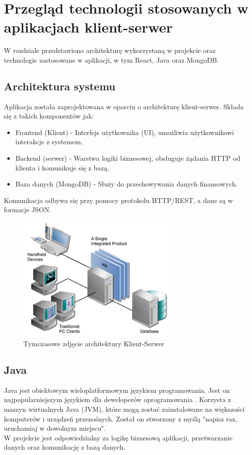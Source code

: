 \chapter{Przegląd technologii stosowanych w aplikacjach klient-serwer}
W rozdziale przedstawiono architekturę wykorzystaną w projekcie oraz technologie zastosowane w aplikacji, w tym React, Java oraz MongoDB.
\section{Architektura systemu}
Aplikacja została zaprojektowana w oparciu o architekturę klient-serwer. Składa się z takich komponentów jak:
\begin{itemize}
	\item Frontend (Klient) - Interfejs użytkownika (UI), umożliwia użytkownikowi interakcje z systemem.
	\item Backend (serwer) - Warstwa logiki biznesowej, obsługuje żądania HTTP od klienta i komunikuje się z bazą.
	\item Baza danych (MongoDB) - Służy do przechowywania danych finansowych.
\end{itemize}

Komunikacja odbywa się przy pomocy protokołu HTTP/REST, a dane są w formacje JSON.
\begin{figure}[H]
	\centering
	\includegraphics[width=0.7\textwidth]{images/vis.jpg}
	\caption{Tymczasowe zdjęcie architektury Klient-Serwer}
	\label{fig:KlientSerwer}
\end{figure}
\section{Java}
Java jest obiektowym wieloplatformowym językiem programowania. Jest on najpopularniejszym językiem dla deweloperów oprogramowania \cite{JavaMicrosoft}. Korzysta z maszyn wirtualnych Java (JVM), które mogą zostać zainstalowane na większości komputerów i urządzeń przenośnych. Został on stworzony z myślą "napisz raz, uruchamiaj w dowolnym miejscu". 
\\W projekcie jest odpowiedzialny za logikę biznesową aplikacji, przetwarzanie danych oraz komunikację z bazą danych.
